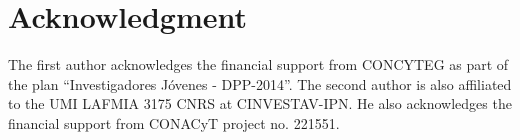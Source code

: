\documentclass[preprint,3p]{elsarticle}
\begin{document}



\section*{Acknowledgment}
The first author acknowledges the financial support from CONCYTEG as part of the plan ``Investigadores J\'ovenes - DPP-2014''.
The second author is also affiliated to the
UMI LAFMIA 3175 CNRS at CINVESTAV-IPN.
He also acknowledges the financial support from CONACyT project no. 221551.



\end{document}
